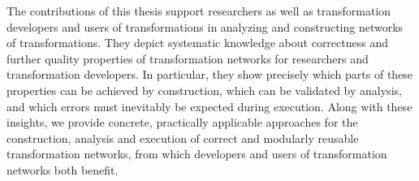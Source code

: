The contributions of this thesis support researchers as well as transformation developers and users of transformations in analyzing and constructing networks of transformations.
They depict systematic knowledge about correctness and further quality properties of transformation networks for researchers and transformation developers.
In particular, they show precisely which parts of these properties can be achieved by construction, which can be validated by analysis, and which errors must inevitably be expected during execution. 
Along with these insights, we provide concrete, practically applicable approaches for the construction, analysis and execution of correct and modularly reusable transformation networks, from which developers and users of transformation networks both benefit.
